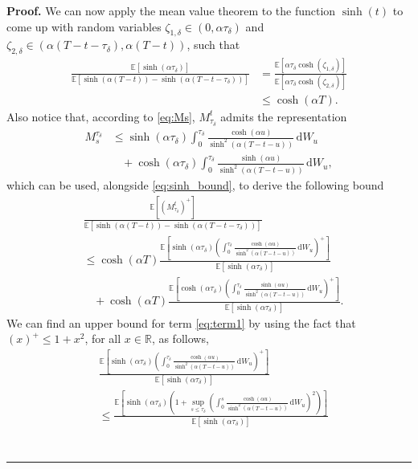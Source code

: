 \documentclass{tufte-handout}
\newcommand{\E}{\mathbb{E}} %
\newcommand{\R}{\mathbb{R}} %
\newcommand{\dif}{\mathrm{d}}
\newenvironment{pf}[1][Proof]{\textbf{#1.} }{\ \rule{0.5em}{0.5em}}
\begin{document}
\begin{pf}
		We can now apply the mean value theorem to the function $\sinh(t)$ to come up with random variables $\zeta_{1,\delta} \in (0, \alpha \tau_\delta)$ and $\zeta_{2,\delta} \in (\alpha(T - t - \tau_\delta), \alpha(T - t))$, such that
		\begin{align}\label{eq:sinh_bound}
		\frac{\E\left[\sinh(\alpha \tau_\delta)\right]}{\E\left[\sinh(\alpha(T - t)) - \sinh(\alpha (T - t - \tau_\delta))\right]} &= \frac{\E\left[\alpha\tau_\delta\cosh(\zeta_{1,\delta})\right]}{\E\left[\alpha\tau_\delta \cosh(\zeta_{2,\delta})\right]} \nonumber \\ 
		&\leq \cosh(\alpha T).
		\end{align}
		Also notice that, according to \eqref{eq:Ms}, $M_{\tau_\delta}^t$ admits the representation
		\begin{align*}
		M_s^{\tau_\delta} &\leq \sinh(\alpha\tau_\delta)\int_{0}^{\tau_\delta}\frac{\cosh(\alpha u)}{\sinh^2(\alpha(T - t - u))}\,\dif W_u \\
		&\ \ \ \ + \cosh(\alpha\tau_\delta)\int_{0}^{\tau_\delta}\frac{\sinh(\alpha u)}{\sinh^2(\alpha(T - t - u))}\,\dif W_u,
		\end{align*}
		which can be used, alongside \eqref{eq:sinh_bound}, to derive the following bound
		\begin{align}
		&\frac{\E\left[\left(M_{\tau_\delta}^t\right)^+\right]}{\E\left[\sinh(\alpha(T - t)) - \sinh(\alpha (T - t - \tau_\delta))\right]} \nonumber \\ 
		&\leq \cosh(\alpha T)\frac{\E\left[\sinh(\alpha\tau_\delta)\left(\int_{0}^{\tau_\delta}\frac{\cosh(\alpha u)}{\sinh^2(\alpha(T - t - u))}\,\dif W_u\right)^+\right]}{\E\left[\sinh(\alpha\tau_\delta)\right]} \label{eq:term1} \\
		&\ \ \ \ +\cosh(\alpha T)\frac{\E\left[\cosh(\alpha\tau_\delta)\left(\int_{0}^{\tau_\delta}\frac{\sinh(\alpha u)}{\sinh^2(\alpha(T - t - u))}\,\dif W_u\right)^+\right]}{\E\left[\sinh(\alpha\tau_\delta)\right]}. \label{eq:term2}
		\end{align}
		We can find an upper bound for term \eqref{eq:term1} by using the fact that $(x)^+ \leq 1 + x^2$, for all $x\in \R$, as follows,
		\begin{align*}
		&\frac{\E\left[\sinh(\alpha\tau_\delta)\left(\int_{0}^{\tau_\delta}\frac{\cosh(\alpha u)}{\sinh^2(\alpha(T - t - u))}\,\dif W_u\right)^+\right]}{\E\left[\sinh(\alpha\tau_\delta)\right]} \\
		&\leq \frac{\E\left[\sinh(\alpha\tau_\delta)\left(1 + \sup_{s\leq \tau_\delta}\left(\int_{0}^{s}\frac{\cosh(\alpha u)}{\sinh^2(\alpha(T - t - u))}\,\dif W_u\right)^2\right)\right]}{\E\left[\sinh(\alpha\tau_\delta)\right]} \\

\end{align*}
\end{pf}
\end{document}
